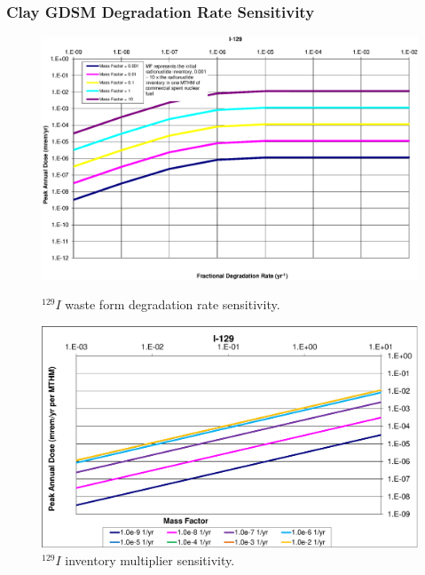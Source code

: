 \begin{frame}[ctb!]
\frametitle{Clay GDSM Degradation Rate Sensitivity}

\begin{figure}[ht!]
\begin{minipage}[b]{0.45\linewidth}
\centering
\includegraphics[width=\linewidth]{./nuclide_demonstration/DegRate/I-129.eps}
\caption{$^{129}I$ waste form degradation rate sensitivity.}
\label{fig:WFDegI129}

\end{minipage}
\hspace{0.05\linewidth}
\begin{minipage}[b]{0.45\linewidth}

\includegraphics[width=\linewidth]{./nuclide_demonstration/DegRate/I-129-MF.eps}
\caption{$^{129}I$ inventory multiplier sensitivity.}
\label{fig:WFDegI129MF}

\end{minipage}
\end{figure}
\end{frame}
